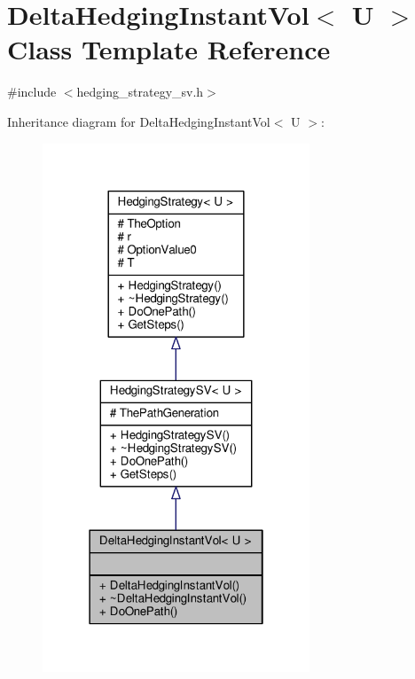 \hypertarget{classDeltaHedgingInstantVol}{}\section{Delta\+Hedging\+Instant\+Vol$<$ U $>$ Class Template Reference}
\label{classDeltaHedgingInstantVol}


{\ttfamily \#include $<$hedging\+\_\+strategy\+\_\+sv.\+h$>$}



Inheritance diagram for Delta\+Hedging\+Instant\+Vol$<$ U $>$\+:
\nopagebreak
\begin{figure}[H]
\begin{center}
\leavevmode
\includegraphics[width=226pt]{classDeltaHedgingInstantVol__inherit__graph}
\end{center}
\end{figure}


